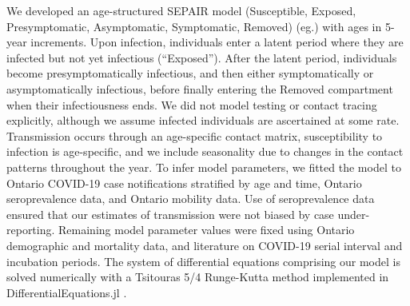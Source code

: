 We developed an age-structured SEPAIR model (Susceptible, Exposed, Presymptomatic, Asymptomatic, Symptomatic, Removed) (eg.\cite{wu2006reducing}) with ages in 5-year increments. Upon infection, individuals enter a latent period where they are infected but not yet infectious (“Exposed”).  After the latent period, individuals become presymptomatically infectious, and then either symptomatically or asymptomatically infectious, before finally entering the Removed compartment when their infectiousness ends. We did not model testing or contact tracing explicitly, although we assume infected individuals are ascertained at some rate. Transmission occurs through an age-specific contact matrix, susceptibility to infection is age-specific, and we include seasonality due to changes in the contact patterns throughout the year.  To infer model parameters, we fitted the model to Ontario COVID-19 case notifications stratified by age and time, Ontario seroprevalence data, and Ontario mobility data.  Use of seroprevalence data ensured that our estimates of transmission were not biased by case under-reporting. Remaining model parameter values were fixed using Ontario demographic and mortality data, and literature on COVID-19 serial interval and incubation periods. The system of differential equations comprising our model is solved numerically with a Tsitouras 5/4 Runge-Kutta method implemented in DifferentialEquations.jl \cite{rackauckas2017differentialequations,bezanson2012julia}.

